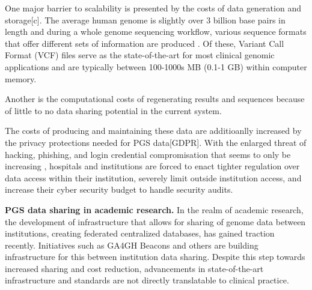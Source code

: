\documentclass[a4paper,11pt]{article}
\begin{document}
One major barrier to scalability is presented by the costs of data generation and storage[c].
The average human genome is slightly over 3 billion base pairs in length and during a whole genome sequencing workflow, various sequence formats that offer different sets of information are produced \cite{bagger_whole_2024}.
Of these, Variant Call Format (VCF) files \cite{danecek_variant_2011} serve as the state-of-the-art for most clinical genomic applications and are typically between 100-1000s MB (0.1-1 GB) within computer memory. 

Another is the computational costs of regenerating results and sequences because of little to no data sharing potential in the current system.

The costs of producing and maintaining these data are additioanlly increased by the privacy protections needed for PGS data[GDPR].
With the enlarged threat of hacking, phishing, and login credential compromisation that seems to only be increasing \cite{noauthor_ransomware_nodate}, hospitals and institutions are forced to enact tighter regulation over data access within their institution, severely limit outside institution access, and increase their cyber security budget to handle security audits.

\textbf{PGS data sharing in academic research.}
In the realm of academic research, the development of infrastructure that allows for sharing of genome data between institutions, creating federated centralized databases, has gained traction recently. 
Initiatives such as GA4GH Beacons \cite{rambla_beacon_2022} and others are building infrastructure for this between institution data sharing. 
Despite this step towards increased sharing and cost reduction, advancements in state-of-the-art infrastructure and standards are not directly translatable to clinical practice. 
\end{document}
